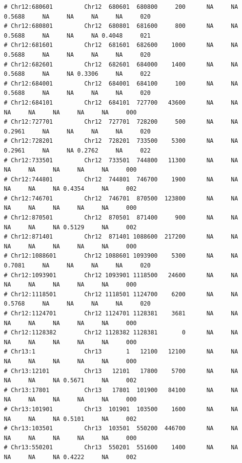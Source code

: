 \documentclass{article}\usepackage[]{graphicx}\usepackage[]{color}
\makeatletter
\newenvironment{kframe}{%
 \def\at@end@of@kframe{}%
 \ifinner\ifhmode%
  \def\at@end@of@kframe{\end{minipage}}%
  \begin{minipage}{\columnwidth}%
 \fi\fi%
 \def\FrameCommand##1{\hskip\@totalleftmargin \hskip-\fboxsep
 \colorbox{shadecolor}{##1}\hskip-\fboxsep
     \hskip-\linewidth \hskip-\@totalleftmargin \hskip\columnwidth}%
 \MakeFramed {\advance\hsize-\width
   \@totalleftmargin\z@ \linewidth\hsize
   \@setminipage}}%
 {\par\unskip\endMakeFramed%
 \at@end@of@kframe}
\newenvironment{knitrout}{}{} %
\makeatother
\begin{document}
\begin{knitrout}
\begin{kframe}
\begin{verbatim}
# Chr12:680601         Chr12  680601  680800     200      NA     NA 0.5688     NA     NA     NA     NA     020
# Chr12:680801         Chr12  680801  681600     800      NA     NA 0.5688     NA     NA     NA 0.4048     021
# Chr12:681601         Chr12  681601  682600    1000      NA     NA 0.5688     NA     NA     NA     NA     020
# Chr12:682601         Chr12  682601  684000    1400      NA     NA 0.5688     NA     NA 0.3306     NA     022
# Chr12:684001         Chr12  684001  684100     100      NA     NA 0.5688     NA     NA     NA     NA     020
# Chr12:684101         Chr12  684101  727700   43600      NA     NA     NA     NA     NA     NA     NA     000
# Chr12:727701         Chr12  727701  728200     500      NA     NA 0.2961     NA     NA     NA     NA     020
# Chr12:728201         Chr12  728201  733500    5300      NA     NA 0.2961     NA     NA 0.2762     NA     022
# Chr12:733501         Chr12  733501  744800   11300      NA     NA     NA     NA     NA     NA     NA     000
# Chr12:744801         Chr12  744801  746700    1900      NA     NA     NA     NA     NA 0.4354     NA     002
# Chr12:746701         Chr12  746701  870500  123800      NA     NA     NA     NA     NA     NA     NA     000
# Chr12:870501         Chr12  870501  871400     900      NA     NA     NA     NA     NA 0.5129     NA     002
# Chr12:871401         Chr12  871401 1088600  217200      NA     NA     NA     NA     NA     NA     NA     000
# Chr12:1088601        Chr12 1088601 1093900    5300      NA     NA 0.7081     NA     NA     NA     NA     020
# Chr12:1093901        Chr12 1093901 1118500   24600      NA     NA     NA     NA     NA     NA     NA     000
# Chr12:1118501        Chr12 1118501 1124700    6200      NA     NA 0.5768     NA     NA     NA     NA     020
# Chr12:1124701        Chr12 1124701 1128381    3681      NA     NA     NA     NA     NA     NA     NA     000
# Chr12:1128382        Chr12 1128382 1128381       0      NA     NA     NA     NA     NA     NA     NA     000
# Chr13:1              Chr13       1   12100   12100      NA     NA     NA     NA     NA     NA     NA     000
# Chr13:12101          Chr13   12101   17800    5700      NA     NA     NA     NA     NA 0.5671     NA     002
# Chr13:17801          Chr13   17801  101900   84100      NA     NA     NA     NA     NA     NA     NA     000
# Chr13:101901         Chr13  101901  103500    1600      NA     NA     NA     NA     NA 0.5101     NA     002
# Chr13:103501         Chr13  103501  550200  446700      NA     NA     NA     NA     NA     NA     NA     000
# Chr13:550201         Chr13  550201  551600    1400      NA     NA     NA     NA     NA 0.4222     NA     002

\end{verbatim}
\end{kframe}
\end{knitrout}
\end{document}
